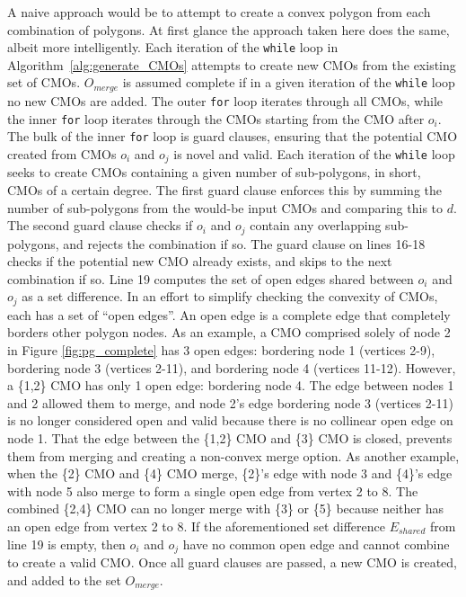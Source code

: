 A naive approach would be to attempt to create a convex polygon from each combination of polygons.
At first glance the approach taken here does the same, albeit more intelligently.
Each iteration of the \verb|while| loop in Algorithm~\ref{alg:generate_CMOs} attempts to create new CMOs from the existing set of CMOs.
$O_{merge}$ is assumed complete if in a given iteration of the \verb|while| loop no new CMOs are added.
The outer \verb|for| loop iterates through all CMOs, while the inner \verb|for| loop iterates through the CMOs starting from the CMO after $o_i$.
The bulk of the inner \verb|for| loop is guard clauses, ensuring that the potential CMO created from CMOs $o_i$ and $o_j$ is novel and valid.
Each iteration of the \verb|while| loop seeks to create CMOs containing a given number of sub-polygons, in short, CMOs of a certain degree.
The first guard clause enforces this by summing the number of sub-polygons from the would-be input CMOs and comparing this to $d$.
The second guard clause checks if $o_i$ and $o_j$ contain any overlapping sub-polygons, and rejects the combination if so.
The guard clause on lines 16-18 checks if the potential new CMO already exists, and skips to the next combination if so.
Line 19 computes the set of open edges shared between $o_i$ and $o_j$ as a set difference.
In an effort to simplify checking the convexity of CMOs, each has a set of ``open edges''.
An open edge is a complete edge that completely borders other polygon nodes.
As an example, a CMO comprised solely of node 2 in Figure \ref{fig:pg_complete} has 3 open edges: bordering node 1 (vertices 2-9), bordering node 3 (vertices 2-11), and bordering node 4 (vertices 11-12).
However, a \{1,2\} CMO has only 1 open edge: bordering node 4.
The edge between nodes 1 and 2 allowed them to merge, and node 2's edge bordering node 3 (vertices 2-11) is no longer considered open and valid because there is no collinear open edge on node 1.
That the edge between the \{1,2\} CMO and \{3\} CMO is closed, prevents them from merging and creating a non-convex merge option.
As another example, when the \{2\} CMO and \{4\} CMO merge, \{2\}'s edge with node 3 and \{4\}'s edge with node 5 also merge to form a single open edge from vertex 2 to 8.
The combined \{2,4\} CMO can no longer merge with \{3\} or \{5\} because neither has an open edge from vertex 2 to 8.
If the aforementioned set difference $E_{shared}$ from line 19 is empty, then $o_i$ and $o_j$ have no common open edge and cannot combine to create a valid CMO.
Once all guard clauses are passed, a new CMO is created, and added to the set $O_{merge}$.

